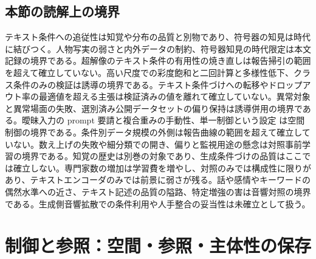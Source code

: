 \documentclass[lualatex,a4paper,10pt]{jlreq}
\begin{document}
\subsection{本節の読解上の境界}
テキスト条件への追従性は知覚や分布の品質と別物であり、符号器の知見は時代に結びつく\autocite{btd011}。人物写実の弱さと内外データの制約、符号器知見の時代限定は本文記録の境界である\autocite{btd011}。超解像のテキスト条件の有用性の焼き直しは報告掃引の範囲を超えて確立していない。高い尺度での彩度飽和と二回計算と多様性低下、クラス条件のみの検証は誘導の境界である\autocite{btd032}。テキスト条件づけへの転移やドロップアウト率の最適値を超える主張は検証済みの値を離れて確立していない。異常対象と異常場面の失敗、選別済み公開データセットの偏り保持は誘導併用の境界である\autocite{btd033}。曖昧入力の prompt 要請と複合重みの手動性、単一制御という設定 は空間制御の境界である\autocite{btd036}。条件別データ規模の外側は報告曲線の範囲を超えて確立していない。数え上げの失敗や細分類での開き、偏りと監視用途の懸念は対照事前学習の境界である\autocite{btd031}。知覚の歴史は別巻の対象であり、生成条件づけの品質はここでは確立しない。専門家数の増加は学習費を増やし、対照のみでは構成性に限りがあり、テキストエンコーダのみでは前景に弱さが残る\autocite{btd034}。話や感情やキーワードの偶然水準への近さ、テキスト記述の品質の隘路、特定増強の害は音響対照の境界である\autocite{btd035}。生成側音響拡散での条件利用や人手整合の妥当性は未確立として扱う。

\section{制御と参照：空間・参照・主体性の保存}
\label{sec:control}
\end{document}
